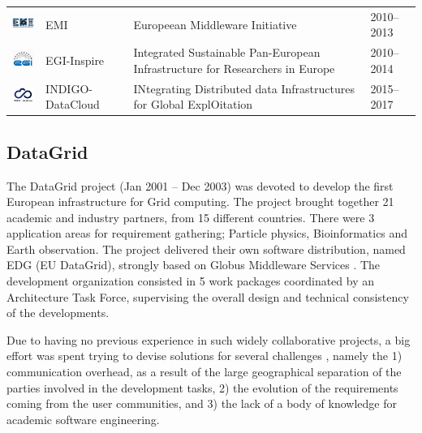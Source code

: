 \documentclass[journal]{IEEEtran}
\begin{document}
\begin{table}[!h]
\begin{tabular}{p{1.6cm}p{1.5cm}p{3cm}l}
\begin{minipage}{.3\textwidth}
\includegraphics[width=15mm,height=7.5mm]{images/emi}
\end{minipage}
     & EMI &
Europeean Middleware Initiative & 2010--2013\\
\begin{minipage}{.3\textwidth}
\includegraphics[width=15mm,height=7.5mm]{images/egi}
\end{minipage}
     & EGI-Inspire &
Integrated Sustainable Pan-European Infrastructure for Researchers in Europe
 & 2010--2014\\
\begin{minipage}{.3\textwidth}
\includegraphics[width=15mm,height=7.5mm]{images/indigo}
\end{minipage}
     & INDIGO-DataCloud &
INtegrating Distributed data Infrastructures for Global ExplOitation
 & 2015--2017\\
\hline
\hline
\end{tabular}
\end{table}



\subsection{DataGrid}

The DataGrid \cite{cordis:datagrid} project (Jan 2001 -- Dec 2003) was devoted
to develop the first European infrastructure for Grid computing. The project
brought together 21 academic and industry partners, from 15 different
countries. There were 3 application areas for requirement gathering;
Particle physics, Bioinformatics and Earth observation. The project delivered
their own software distribution, named EDG (EU DataGrid), strongly based on
Globus Middleware Services \cite{globus}. The development organization
consisted in 5 work packages coordinated by an Architecture Task Force,
supervising the overall design and technical consistency of the developments.

Due to having no previous experience in such widely
collaborative projects, a big effort was spent trying to devise solutions for several
challenges \cite{datagrid}, namely the 1) communication overhead, as a
result of the large geographical separation of the parties involved in the
development tasks, 2) the evolution of the requirements coming from the user
communities, and 3) the lack of a body of knowledge for academic software
engineering.
\end{document}
